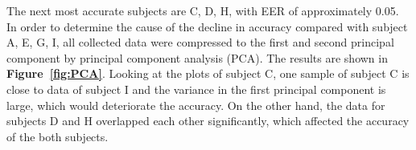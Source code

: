 \documentclass[sigchi,authordraft]{acmart}
\newcommand\figref[1]{\textbf{Figure~\ref{fig:#1}}}
\newcommand\tabref[1]{\textbf{Table~\ref{tab:#1}}}
\begin{document}




The next most accurate subjects are C, D, H, with EER of approximately 0.05. In order to determine the cause of the decline in accuracy compared with subject A, E, G, I, all collected data were compressed to the first and second principal component by principal component analysis (PCA). The results are shown in \figref{PCA}. Looking at the plots of subject C, one sample of subject C is close to data of subject I and the variance in the first principal component is large, which would deteriorate the accuracy. On the other hand, the data for subjects D and H overlapped each other significantly, which affected the accuracy of the both subjects.\par

\end{document}
